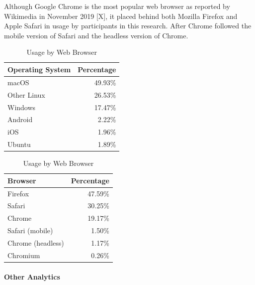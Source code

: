 \documentclass{article}
\begin{document}
Although Google Chrome is the most popular web browser as reported by Wikimedia in November 2019 [X], it placed behind both Mozilla Firefox and Apple Safari in usage by participants in this research. After Chrome followed the mobile version of Safari and the headless version of Chrome.

\begin{table}[!htb]
	\begin{minipage}{.5\linewidth}
		\caption{Usage by Operating System}
		\centering
		\begin{tabular}{lr}
			\hline
			\textbf{Operating System} & \textbf{Percentage} \\
			\hline
			macOS                     & 49.93\%             \\
			Other Linux               & 26.53\%             \\
			Windows                   & 17.47\%             \\
			Android                   & 2.22\%              \\
			iOS                       & 1.96\%              \\
			Ubuntu                    & 1.89\%              \\
			\hline
		\end{tabular}
	\end{minipage}%
	\hspace{.1cm}
	\begin{minipage}{.5\linewidth}
		\centering
		\caption{Usage by Web Browser}
		\begin{tabular}{lr}
			\hline
			\textbf{Browser}  & \textbf{Percentage} \\
			\hline
			Firefox           & 47.59\%                \\
			Safari            & 30.25\%                \\
			Chrome            & 19.17\%                \\
			Safari (mobile)   & 1.50\%                 \\
			Chrome (headless) & 1.17\%                 \\
			Chromium          & 0.26\%                 \\
			\hline
		\end{tabular}
	\end{minipage} 
\end{table}

\paragraph{Other Analytics}
\end{document}

